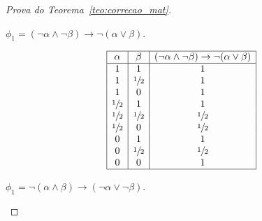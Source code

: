 \begin{proof}[Prova do Teorema~\ref{teo:correcao_mat}]
\begin{provaporcasos}
\begin{provaporsubcasos}
                    

                    \subcasodeprova{} $\phi_{1} = (\neg \alpha \land \neg \beta) \to \neg (\alpha \lor \beta)$.

                    \begin{center}
                        \[
                            \begin{array}{|c|c|c|}%
                                \hline%
                                \alpha      & \beta & (\neg \alpha \land \neg \beta) \to \neg (\alpha \lor \beta) \\
                                \hline%
                                1 & 1 & 1\\
                                1 & \meio{} & 1\\
                                1 & 0 & 1\\
                                \meio{} & 1 & 1\\
                                \meio{} & \meio{} &\meio{}\\ 
                                \meio{} & 0 & \meio{}\\
                                0 & 1 & 1\\
                                0 & \meio{} & \meio{}\\
                                0 & 0 & 1\\
                                \hline%
                            \end{array}
                        \]
                    \end{center}

                    \subcasodeprova{} $\phi_{1} = \neg(\alpha \land \beta) \to (\neg \alpha \lor \neg \beta)$. 


\end{provaporsubcasos}
\end{provaporcasos}
\end{proof}
